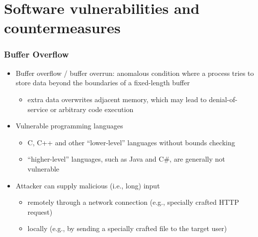 \documentclass[final]{article}
\begin{document}
\section{Software vulnerabilities and countermeasures}
\subsubsection*{Buffer Overflow}
\begin{itemize}[nosep]
    \item Buffer overflow / buffer overrun: anomalous condition where a process tries to store data beyond the boundaries of a fixed-length buffer
          \begin{itemize}[nosep]
              \item extra data overwrites adjacent memory, which may lead to denial-of-service or arbitrary code execution
          \end{itemize}
    \item Vulnerable programming languages
          \begin{itemize}[nosep]
              \item C, C++ and other “lower-level” languages without bounds checking
              \item ``higher-level'' languages, such as Java and C\#, are generally not vulnerable
          \end{itemize}
    \item Attacker can supply malicious (i.e., long) input
          \begin{itemize}[nosep]
              \item remotely through a network connection (e.g., specially crafted HTTP request)
              \item locally (e.g., by sending a specially crafted file to the target user)
          \end{itemize}
\end{itemize}
\end{document}
